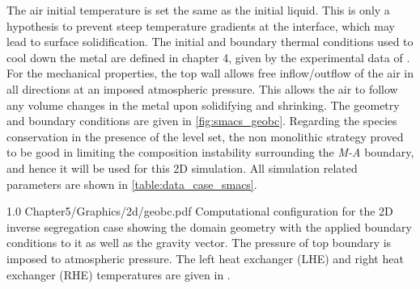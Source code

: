 The air initial temperature is set the same as the initial liquid. This is only a hypothesis to prevent steep temperature gradients at the interface,
which may lead to surface solidification. The initial and boundary thermal conditions used to cool down the metal are defined in chapter 4, given by the experimental
data of \citet{hachani_experimental_2012}. For the mechanical properties, the top wall allows free inflow/outflow of the air in all directions 
at an imposed atmospheric pressure. This allows the air to follow any volume changes in the metal upon solidifying and shrinking. 
The geometry and boundary conditions are given in \cref{fig:smacs_geobc}.
Regarding the species conservation in the presence of the level set, the non monolithic strategy proved to be good in limiting the 
composition instability surrounding the \emph{M-A} boundary, and hence it will be used for this 2D simulation.
All simulation related parameters are shown in \cref{table:data_case_smacs}.

\begin{figureth}
{1.0}
{Chapter5/Graphics/2d/geobc.pdf}
{Computational configuration for the 2D inverse segregation case showing the domain geometry 
with the applied boundary conditions to it as well as the gravity vector.
The pressure of top boundary is imposed to atmospheric pressure. The left heat exchanger (LHE)
and right heat exchanger (RHE) temperatures are given in \citep{hachani_experimental_2012}.}
\label{fig:smacs_geobc}
\end{figureth}

